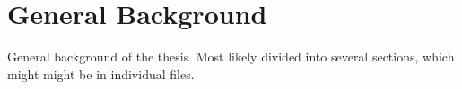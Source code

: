 
\section{General Background}
\label{sec:generalBackground} 

General background of the thesis. Most likely divided into several sections, which might might be in individual files.